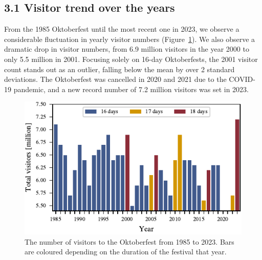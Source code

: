 \documentclass{article}
\theoremstyle{plain}
\theoremstyle{definition}
\theoremstyle{remark}
\begin{document}
\subsection*{3.1 Visitor trend over the years}
From the 1985 Oktoberfest until the most recent one in 2023, we observe a considerable fluctuation in yearly visitor numbers (Figure~\ref{figure_visitors}). We also observe a dramatic drop in visitor numbers, from 6.9 million visitors in the year 2000 to only 5.5 million in 2001. Focusing solely on 16-day Oktoberfests, the 2001 visitor count stands out as an outlier, falling below the mean by over 2 standard deviations. The Oktoberfest was cancelled in 2020 and 2021 due to the COVID-19 pandemic, and a new record number of 7.2 million visitors was set in 2023. 
\begin{figure}[ht]%
  \includegraphics{fig/totalvisitors.pdf}
  \caption{The number of visitors to the Oktoberfest from 1985 to 2023. Bars are coloured depending on the duration of the festival that year.}
  \label{figure_visitors}
\end{figure}
\end{document}
